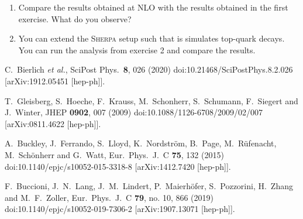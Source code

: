 \documentclass[a4paper,DIV12,fleqn]{scrartcl}
\begin{document}
\begin{enumerate}
  \item Compare the results obtained at NLO with the results obtained
        in the first exercise. What do you observe?
  \item You can extend the \textsc{Sherpa} setup such that is simulates
        top-quark decays. You can run the analysis from exercise
        2 and compare the results.
\end{enumerate}

\begin{thebibliography}{99}
  C.~Bierlich \textit{ et al.},
  SciPost Phys.\  \textbf{8}, 026 (2020)
  doi:10.21468/SciPostPhys.8.2.026
  [arXiv:1912.05451 [hep-ph]].

  T.~Gleisberg, S.~Hoeche, F.~Krauss, M.~Schonherr, S.~Schumann, F.~Siegert and J.~Winter,
  JHEP \textbf{0902}, 007 (2009)
  doi:10.1088/1126-6708/2009/02/007
  [arXiv:0811.4622 [hep-ph]].

  A.~Buckley, J.~Ferrando, S.~Lloyd, K.~Nordström, B.~Page, M.~Rüfenacht, M.~Schönherr and G.~Watt,
  Eur.\ Phys.\ J.\ C \textbf{ 75}, 132 (2015)
  doi:10.1140/epjc/s10052-015-3318-8
  [arXiv:1412.7420 [hep-ph]].

  F.~Buccioni, J.~N.~Lang, J.~M.~Lindert, P.~Maierhöfer, S.~Pozzorini, H.~Zhang and M.~F.~Zoller,
  Eur.\ Phys.\ J.\ C \textbf{79}, no. 10, 866 (2019)
  doi:10.1140/epjc/s10052-019-7306-2
  [arXiv:1907.13071 [hep-ph]].
\end{thebibliography}
\end{document}
